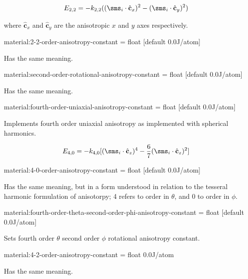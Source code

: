 \begin{equation*}
E_{2,2} = - k_{2,2} ( ( \sms_i \cdot \hat{\mathbf{c}}_x )^2 - ( \sms_i \cdot \hat{\mathbf{c}}_y )^2 )
\end{equation*}

\noindent where $\hat{\mathbf{c}}_x$ and $\hat{\mathbf{c}}_y$ are the anisotropic $x$ and $y$ axes respectively.

{\zicf material:2-2-order-anisotropy-constant = float [default 0.0\newline J/atom]} Has the same meaning.

{\zicf material:second-order-rotational-anisotropy-constant = float [default 0.0\newline J/atom]} Has the same meaning.

{\zicf material:fourth-order-uniaxial-anisotropy-constant = float [default 0.0\newline J/atom]} Implements fourth order uniaxial anisotropy as implemented with spherical harmonics.

\begin{equation*}
  E_{4,0} = - k_{4,0} [ ( \sms_i \cdot \hat{\mathbf{c}}_z )^4 - \frac{6}{7} ( \sms_i \cdot \hat{\mathbf{c}}_z )^2 ]
\end{equation*}

{\zicf material:4-0-order-anisotropy-constant = float [default 0.0\newline J/atom]} Has the same meaning, but in a form understood in relation to the tesseral harmonic formulation of anisotorpy; 4 refers to order in $\theta$, and 0 to order in $\phi$.

{\zicf material:fourth-order-theta-second-order-phi-anisotropy-constant = float [default 0.0\newline J/atom]} Sets fourth order $\theta$ second order $\phi$ rotational anisotropy constant.

{\zicf material:4-2-order-anisotropy-constant = float 0.0\newline J/atom} Has the same meaning.

